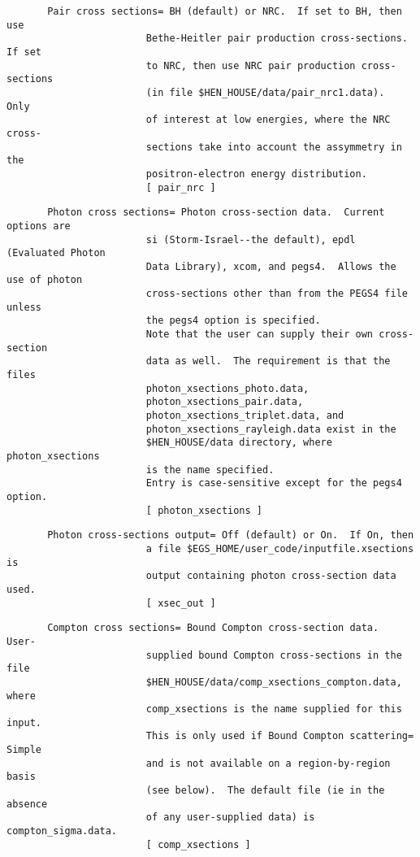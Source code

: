 \begin{verbatim}
       Pair cross sections= BH (default) or NRC.  If set to BH, then use
                        Bethe-Heitler pair production cross-sections.  If set
                        to NRC, then use NRC pair production cross-sections
                        (in file $HEN_HOUSE/data/pair_nrc1.data).  Only
                        of interest at low energies, where the NRC cross-
                        sections take into account the assymmetry in the
                        positron-electron energy distribution. 
                        [ pair_nrc ]
\end{verbatim}
\begin{verbatim}
       Photon cross sections= Photon cross-section data.  Current options are 
                        si (Storm-Israel--the default), epdl (Evaluated Photon
                        Data Library), xcom, and pegs4.  Allows the use of photon
                        cross-sections other than from the PEGS4 file unless
                        the pegs4 option is specified.  
                        Note that the user can supply their own cross-section
                        data as well.  The requirement is that the files 
                        photon_xsections_photo.data, 
                        photon_xsections_pair.data,
                        photon_xsections_triplet.data, and 
                        photon_xsections_rayleigh.data exist in the
                        $HEN_HOUSE/data directory, where photon_xsections
                        is the name specified.
                        Entry is case-sensitive except for the pegs4 option.
                        [ photon_xsections ]
\end{verbatim}
\begin{verbatim}
       Photon cross-sections output= Off (default) or On.  If On, then
                        a file $EGS_HOME/user_code/inputfile.xsections is
                        output containing photon cross-section data used.
                        [ xsec_out ] 
\end{verbatim}
\begin{verbatim}
       Compton cross sections= Bound Compton cross-section data.  User-
                        supplied bound Compton cross-sections in the file
                        $HEN_HOUSE/data/comp_xsections_compton.data, where
                        comp_xsections is the name supplied for this input.
                        This is only used if Bound Compton scattering= Simple
                        and is not available on a region-by-region basis
                        (see below).  The default file (ie in the absence
                        of any user-supplied data) is compton_sigma.data.
                        [ comp_xsections ]
\end{verbatim}
